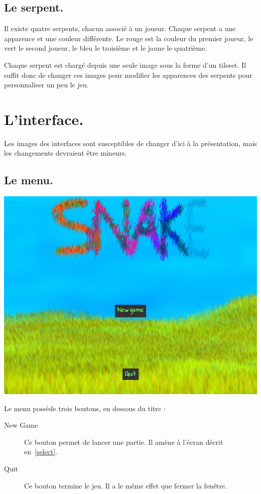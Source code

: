 \documentclass{article}
\begin{document}
\subsection{Le serpent.} \label{snake}
Il existe quatre serpents, chacun associé à un joueur. Chaque serpent a une apparence et une couleur différente. Le rouge est la couleur du premier joueur, le vert le second joueur, le bleu le troisième et le jaune le quatrième.

Chaque serpent est chargé depuis une seule image sous la forme d'un tileset. Il suffit donc de changer ces images pour modifier les apparences des serpents pour personnaliser un peu le jeu.

\section{L'interface.}
Les images des interfaces sont susceptibles de changer d'ici à la présentation, mais les changements devraient être mineurs.

\subsection{Le menu.} \label{menu}
\begin{center}
	\includegraphics[scale=0.4]{img/menu.png}
\end{center}
Le menu possède trois boutons, en dessous du titre :
\begin{description}
	\item[New Game] Ce bouton permet de lancer une partie. Il amène à l'écran décrit en~\ref{select}.
	\item[Quit] Ce bouton termine le jeu. Il a le même effet que fermer la fenêtre.
\end{description}
\end{document}

